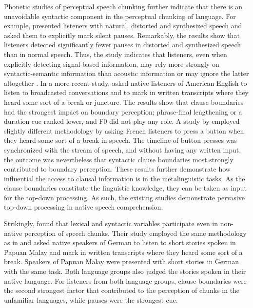 \documentclass[output=paper]{langscibook}
\begin{document}
	Phonetic studies of perceptual speech chunking further indicate that there is an unavoidable syntactic component in the perceptual chunking of language. For example, \citet{duez1985} presented listeners with natural, distorted and synthesized speech and asked them to explicitly mark silent pauses. Remarkably, the results show that listeners detected significantly fewer pauses in distorted and synthesized speech than in normal speech. Thus, the study indicates that listeners, even when explicitly detecting signal-based information, may rely more strongly on syntactic-semantic information than acoustic information or may ignore the latter altogether \citep[for a replication of these results, see][]{simonChristo2016}. In a more recent study, \citet{coleEtAl2010} asked native listeners of American English to listen to broadcasted conversations and to mark in written transcripts where they heard some sort of a break or juncture. The results show that clause boundaries had the strongest impact on boundary perception; phrase-final lengthening or a duration cue ranked lower, and F0 did not play any role. A study by \citet[][]{christodoulidesEtAl2018} employed slightly different methodology by asking French listeners to press a button when they heard some sort of a break in speech. The timeline of button presses was synchronized with the stream of speech, and without having any written input, the outcome was nevertheless that syntactic clause boundaries most strongly contributed to boundary perception. These results further demonstrate how influential the access to clausal information is in the metalinguistic tasks. As the clause boundaries constitute the linguistic knowledge, they can be taken as input for the top-down processing. As such, the existing studies demonstrate pervasive top-down processing in native speech comprehension.
	
	Strikingly, \citet[][]{riesbergEtAl2020} found that lexical and syntactic variables participate even in non-native perception of speech chunks. Their study employed the same methodology as in \citet[][]{coleEtAl2010} and asked native speakers of German to listen to short stories spoken in Papuan Malay and mark in written transcripts where they heard some sort of a break. Speakers of Papuan Malay were presented with short stories in German with the same task. Both language groups also judged the stories spoken in their native language. For listeners from both language groups, clause boundaries were the second strongest factor that contributed to the perception of chunks in the unfamiliar languages, while pauses were the strongest cue.
	
\end{document}
